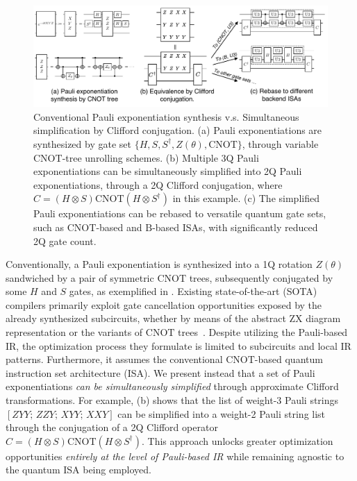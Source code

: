 \documentclass[conference,9pt]{IEEEtran}
\newcommand{\CNOT}{\mathrm{CNOT}}
\begin{document}
    \begin{figure}[tbp]
        \centering   \includegraphics[width=\columnwidth]{figures/motivation.pdf}
        \caption{Conventional Pauli exponentiation synthesis v.s. Simultaneous simplification by Clifford conjugation. (a) Pauli exponentiations are synthesized by gate set $ \{ H, S, S^\dagger, Z(\theta), \CNOT \} $, through variable $ \CNOT $-tree unrolling schemes. (b) Multiple 3Q Pauli exponentiations can be simultaneously simplified into 2Q Pauli exponentiations, through a 2Q Clifford conjugation, where $ C = (H\otimes S) \CNOT (H\otimes S^\dagger) $ in this example. (c) The simplified Pauli exponentiations can be rebased to versatile quantum gate sets, such as $ \CNOT $-based and $ \mathrm{B} $-based ISAs, with significantly reduced 2Q gate count.}
        \label{fig:motivation}
        
    \end{figure}

    Conventionally, a Pauli exponentiation is synthesized into a 1Q rotation $ Z(\theta) $ sandwiched by a pair of symmetric $ \CNOT $ trees, subsequently conjugated by some $ H $ and $ S $ gates, as exemplified in . Existing state-of-the-art (SOTA) compilers primarily exploit gate cancellation opportunities exposed by the already synthesized subcircuits, whether by means of the abstract ZX diagram~\cite{cowtan2019phase,van2023towards,paykin2023pcoast} representation or the variants of $ \CNOT $ trees~\cite{li2022paulihedral,jin2024tetris}. Despite utilizing the Pauli-based IR, the optimization process they formulate is limited to subcircuits and local IR patterns. Furthermore, it assumes the conventional $ \CNOT $-based quantum instruction set architecture (ISA). We present instead that a set of Pauli exponentiations \emph{can be simultaneously simplified} through approximate Clifford transformations. For example,  (b) shows that the list of weight-3 Pauli strings $ [ZYY;\, ZZY;\, XYY;\, XXY] $ can be simplified into a weight-2 Pauli string list through the conjugation of a 2Q Clifford operator $ C = (H\otimes S) \CNOT (H\otimes S^\dagger) $. This approach unlocks greater optimization opportunities \emph{entirely at the level of Pauli-based IR} while remaining agnostic to the quantum ISA being employed.
\end{document}

